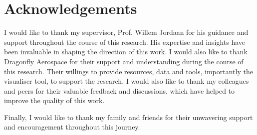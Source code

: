 \chapter*{Acknowledgements}
\makeatletter{}\makeatother

I would like to thank my supervisor, Prof. Willem Jordaan for his guidance and support throughout the course of this research. His expertise and insights have been invaluable in shaping the direction of this work. I would also like to thank Dragonfly Aerospace for their support and understanding during the course of this research. Their willings to provide resources, data and tools, importantly the visualiser tool, to support the research. I would also like to thank my colleagues and peers for their valuable feedback and discussions, which have helped to improve the quality of this work.

Finally, I would like to thank my family and friends for their unwavering support and encouragement throughout this journey.